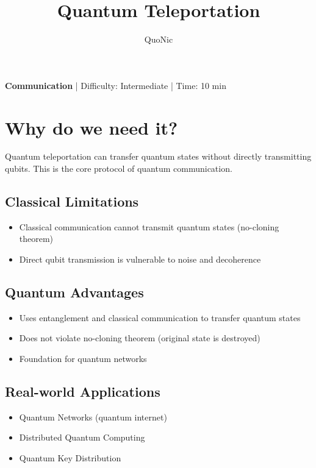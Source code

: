 \documentclass[12pt,a4paper]{article}
\title{Quantum Teleportation}
\author{QuoNic}
\date{}
\begin{document}
\maketitle

\begin{center}
\textbf{Communication} | Difficulty: Intermediate | Time: 10 min
\end{center}

\tableofcontents
\newpage

\section{Why do we need it?}

Quantum teleportation can transfer quantum states without directly transmitting qubits. This is the core protocol of quantum communication.

\subsection{Classical Limitations}
\begin{itemize}
  \item Classical communication cannot transmit quantum states (no-cloning theorem)
  \item Direct qubit transmission is vulnerable to noise and decoherence
\end{itemize}

\subsection{Quantum Advantages}
\begin{itemize}
  \item Uses entanglement and classical communication to transfer quantum states
  \item Does not violate no-cloning theorem (original state is destroyed)
  \item Foundation for quantum networks
\end{itemize}

\subsection{Real-world Applications}
\begin{itemize}
  \item Quantum Networks (quantum internet)
  \item Distributed Quantum Computing
  \item Quantum Key Distribution
\end{itemize}
\end{document}
